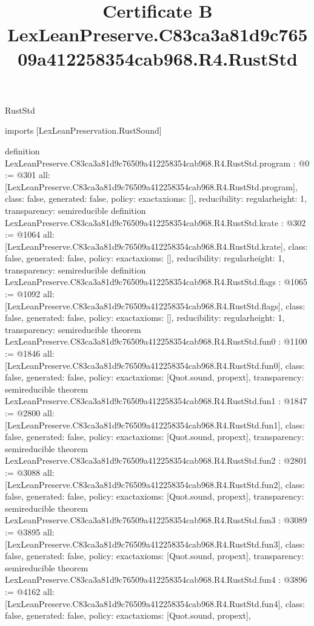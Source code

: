 \begin{lexlean}{RustStd}
\title{Certificate B LexLeanPreserve.C83ca3a81d9c76509a412258354cab968.R4.RustStd}
\begin{coremodule}
imports [LexLeanPreservation.RustSound]

definition LexLeanPreserve.C83ca3a81d9c76509a412258354cab968.R4.RustStd.program : @0 := @301 {
  all: [LexLeanPreserve.C83ca3a81d9c76509a412258354cab968.R4.RustStd.program],
  class: false,
  generated: false,
  policy: exact{axioms: []},
  reducibility: regular{height: 1},
  transparency: semireducible
}
definition LexLeanPreserve.C83ca3a81d9c76509a412258354cab968.R4.RustStd.krate : @302 := @1064 {
  all: [LexLeanPreserve.C83ca3a81d9c76509a412258354cab968.R4.RustStd.krate],
  class: false,
  generated: false,
  policy: exact{axioms: []},
  reducibility: regular{height: 1},
  transparency: semireducible
}
definition LexLeanPreserve.C83ca3a81d9c76509a412258354cab968.R4.RustStd.flags : @1065 := @1092 {
  all: [LexLeanPreserve.C83ca3a81d9c76509a412258354cab968.R4.RustStd.flags],
  class: false,
  generated: false,
  policy: exact{axioms: []},
  reducibility: regular{height: 1},
  transparency: semireducible
}
theorem LexLeanPreserve.C83ca3a81d9c76509a412258354cab968.R4.RustStd.fun0 : @1100 := @1846 {
  all: [LexLeanPreserve.C83ca3a81d9c76509a412258354cab968.R4.RustStd.fun0],
  class: false,
  generated: false,
  policy: exact{axioms: [Quot.sound, propext]},
  transparency: semireducible
}
theorem LexLeanPreserve.C83ca3a81d9c76509a412258354cab968.R4.RustStd.fun1 : @1847 := @2800 {
  all: [LexLeanPreserve.C83ca3a81d9c76509a412258354cab968.R4.RustStd.fun1],
  class: false,
  generated: false,
  policy: exact{axioms: [Quot.sound, propext]},
  transparency: semireducible
}
theorem LexLeanPreserve.C83ca3a81d9c76509a412258354cab968.R4.RustStd.fun2 : @2801 := @3088 {
  all: [LexLeanPreserve.C83ca3a81d9c76509a412258354cab968.R4.RustStd.fun2],
  class: false,
  generated: false,
  policy: exact{axioms: [Quot.sound, propext]},
  transparency: semireducible
}
theorem LexLeanPreserve.C83ca3a81d9c76509a412258354cab968.R4.RustStd.fun3 : @3089 := @3895 {
  all: [LexLeanPreserve.C83ca3a81d9c76509a412258354cab968.R4.RustStd.fun3],
  class: false,
  generated: false,
  policy: exact{axioms: [Quot.sound, propext]},
  transparency: semireducible
}
theorem LexLeanPreserve.C83ca3a81d9c76509a412258354cab968.R4.RustStd.fun4 : @3896 := @4162 {
  all: [LexLeanPreserve.C83ca3a81d9c76509a412258354cab968.R4.RustStd.fun4],
  class: false,
  generated: false,
  policy: exact{axioms: [Quot.sound, propext]},
}
\end{coremodule}
\end{lexlean}
